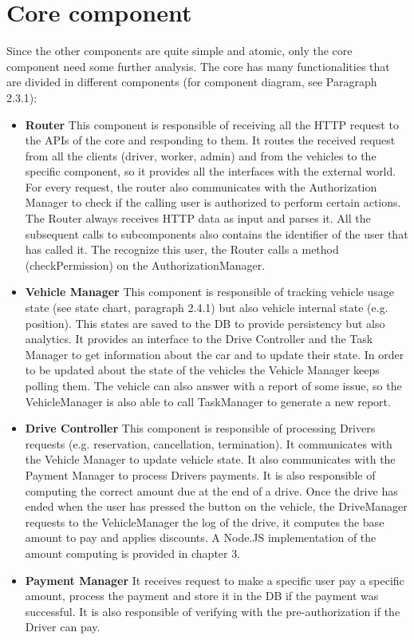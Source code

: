 \section {Core component}
Since the other components are quite simple and atomic, only the core component need some further analysis. The core has many functionalities that are divided in different components (for component diagram, see Paragraph 2.3.1):
\begin{itemize}
\item \textbf{Router} This component is responsible of receiving all the HTTP request to the APIs of the core and responding to them. It routes the received request from all the clients (driver, worker, admin) and from the vehicles to the specific component, so it provides all the interfaces with the external world. For every request, the router also communicates with the Authorization Manager to check if the calling user is authorized to perform certain actions. The Router always receives HTTP data as input and parses it. All the subsequent calls to subcomponents also contains the identifier of the user that has called it. The recognize this user, the Router calls a method (checkPermission) on the AuthorizationManager.
\item \textbf{Vehicle Manager} This component is responsible of tracking vehicle usage state (see state chart, paragraph 2.4.1) but also vehicle internal state (e.g. position). This states are saved to the DB to provide persistency but also analytics. It provides an interface to the Drive Controller and the Task Manager to get information about the car and to update their state. In order to be updated about the state of the vehicles the Vehicle Manager keeps polling them. The vehicle can also answer with a report of some issue, so the VehicleManager is also able to call TaskManager to generate a new report.
\item \textbf{Drive Controller} This component is responsible of processing Drivers requests (e.g. reservation, cancellation, termination). It communicates with the Vehicle Manager to update vehicle state. It also communicates with the Payment Manager to process Drivers payments. It is also responsible of computing the correct amount due at the end of a drive. Once the drive has ended when the user has pressed the button on the vehicle, the DriveManager requests to the VehicleManager the log of the drive, it computes the base amount to pay and applies discounts. A Node.JS implementation of the amount computing is provided in chapter 3.
\item \textbf{Payment Manager} It receives request to make a specific user pay a specific amount, process the payment and store it in the DB if the payment was successful. It is also responsible of verifying with the pre-authorization if the Driver can pay. 

\end{itemize}
